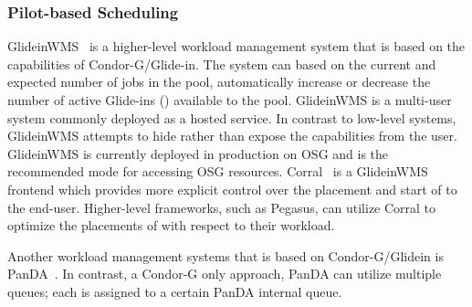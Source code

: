 \documentclass{sig-alternate}
\begin{document}
\subsubsection{Pilot-based Scheduling}

 

GlideinWMS~\cite{1742-6596-119-6-062044} is a higher-level workload management
system that is based on the \pilot capabilities of Condor-G/Glide-in. The
system can based on the current and expected number of jobs in the pool,
automatically increase or decrease the number of active Glide-ins (\pilots)
available to the pool. GlideinWMS is a multi-user \pilotjob system commonly
deployed as a hosted service. In contrast to low-level \pilotjob systems,
GlideinWMS attempts to hide rather than expose the \pilot capabilities from
the user. GlideinWMS is currently deployed in production on OSG and is the
recommended mode for accessing OSG resources.
Corral~\cite{Rynge:2011:EUG:2116259.2116599} is a GlideinWMS frontend which
provides more explicit control over the placement and start of \pilots to the
end-user. Higher-level frameworks, such as Pegasus, can utilize Corral to
optimize the placements of \pilots with respect to their workload.

Another workload management systems that is based on Condor-G/Glidein is
PanDA~\cite{1742-6596-331-7-072069}. In contrast, a Condor-G only approach,
PanDA can utilize multiple queues; each \pilot is assigned to a certain PanDA
internal queue.
\end{document}
